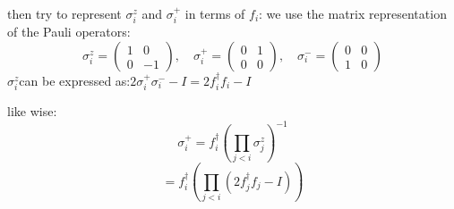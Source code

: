 \documentclass[12pt]{article}
\begin{document}
then try to represent $\sigma_i^z$ and $\sigma_i^+$ in terms of $f_i$:
we use the matrix representation of the Pauli operators:
\[
\sigma_i^z = \begin{pmatrix}
1 & 0 \\
0 & -1
\end{pmatrix}, \quad \sigma_i^+ = \begin{pmatrix}
0 & 1 \\
0 & 0
\end{pmatrix}, \quad \sigma_i^- = \begin{pmatrix}
0 & 0 \\
1 & 0
\end{pmatrix}
\]
$\sigma_i^z  $can be expressed as:$  2\sigma_i^+\sigma_i^- -I = 2f_i^{\dagger} f_i-I$


like wise:
\[
\sigma_i^+ = f_i^{\dagger} \left( \prod_{j<i} \sigma_j^z \right)^{-1}
\]
\[
= f_i^{\dagger} \left( \prod_{j<i} (2f_j^{\dagger} f_j - I) \right)
\]
\end{document}
